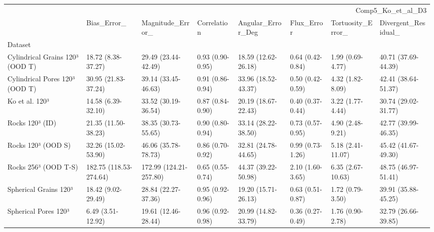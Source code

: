 \begin{tabular}{llllllll}
\toprule
 & \multicolumn{7}{r}{Comp5_Ko_et_al_D3} \\
 & Bias_Error_ & Magnitude_Error_ & Correlation & Angular_Error_Deg & Flux_Error & Tortuosity_Error_ & Divergent_Residual_ \\
Dataset &  &  &  &  &  &  &  \\
\midrule
Cylindrical Grains 120³ (OOD T) & 18.72 (8.38-37.27) & 29.49 (23.44-42.49) & 0.93 (0.90-0.95) & 18.59 (12.62-26.18) & 0.64 (0.42-0.84) & 1.99 (0.69-4.77) & 40.71 (37.69-44.39) \\
Cylindrical Pores 120³ (OOD T) & 30.95 (21.83-37.24) & 39.14 (33.45-46.63) & 0.91 (0.86-0.94) & 33.96 (18.52-43.37) & 0.50 (0.42-0.59) & 4.32 (1.82-8.09) & 42.41 (38.64-51.37) \\
Ko et al. 120³ & 14.58 (6.39-32.10) & 33.52 (30.19-36.54) & 0.87 (0.84-0.90) & 20.19 (18.67-22.43) & 0.40 (0.37-0.44) & 3.22 (1.77-4.44) & 30.74 (29.02-31.77) \\
Rocks 120³ (ID) & 21.35 (11.50-38.23) & 38.35 (30.73-55.65) & 0.90 (0.80-0.94) & 33.14 (28.22-38.50) & 0.73 (0.57-0.95) & 4.90 (2.48-9.21) & 42.77 (39.99-46.35) \\
Rocks 120³ (OOD S) & 32.26 (15.02-53.90) & 46.06 (35.78-78.73) & 0.86 (0.70-0.92) & 32.81 (24.78-44.65) & 0.99 (0.73-1.26) & 5.18 (2.41-11.07) & 45.42 (41.67-49.30) \\
Rocks 256³ (OOD T-S) & 182.75 (118.53-274.64) & 172.99 (124.21-257.80) & 0.65 (0.55-0.74) & 44.37 (39.22-50.98) & 2.10 (1.60-3.65) & 6.35 (2.67-10.63) & 48.75 (46.97-51.41) \\
Spherical Grains 120³ & 18.42 (9.02-29.49) & 28.84 (22.27-37.36) & 0.95 (0.92-0.96) & 19.20 (15.71-26.13) & 0.63 (0.51-0.87) & 1.72 (0.79-3.50) & 39.91 (35.88-45.25) \\
Spherical Pores 120³ & 6.49 (3.51-12.92) & 19.61 (12.46-28.44) & 0.96 (0.92-0.98) & 20.99 (14.82-33.79) & 0.36 (0.27-0.49) & 1.76 (0.90-2.78) & 32.79 (26.66-39.85) \\
\bottomrule
\end{tabular}
